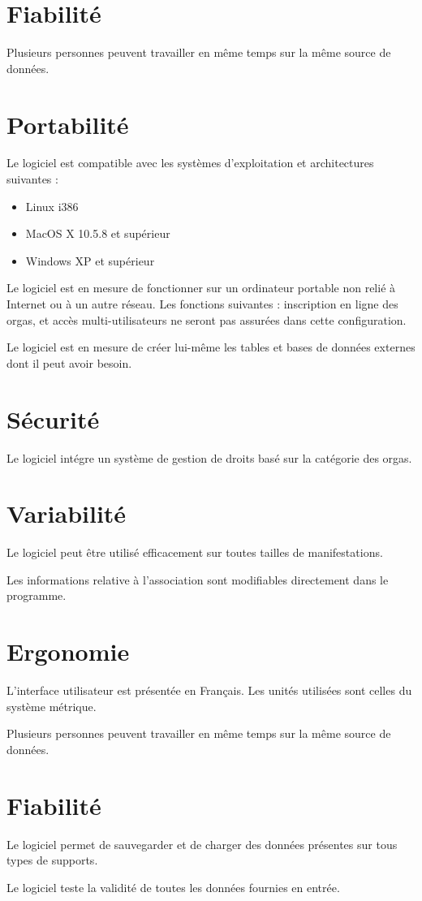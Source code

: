 \section{Fiabilité}
Plusieurs personnes peuvent travailler en même temps sur la même source de données.


\section{Portabilité}
Le logiciel est compatible avec les systèmes d'exploitation et architectures suivantes : 
\begin{itemize}
\item Linux i386
\item MacOS X 10.5.8 et supérieur
\item Windows XP et supérieur
\end{itemize}

Le logiciel est en mesure de fonctionner sur un ordinateur portable non relié à Internet ou à un autre réseau. 
Les fonctions suivantes : inscription en ligne des orgas, et accès multi-utilisateurs ne seront pas assurées dans cette configuration.

Le logiciel est en mesure de créer lui-même les tables et bases de données externes dont il peut avoir besoin.


\section{Sécurité}
Le logiciel intégre un système de gestion de droits basé sur la catégorie des orgas.


\section{Variabilité}
Le logiciel peut être utilisé efficacement sur toutes tailles de manifestations.

Les informations relative à l'association sont modifiables directement dans le programme.

\section{Ergonomie}
L'interface utilisateur est présentée en Français. Les unités utilisées sont celles du système métrique. 

Plusieurs personnes peuvent travailler en même temps sur la même source de données.


\section{Fiabilité}
Le logiciel permet de sauvegarder et de charger des données présentes sur tous types de supports.

Le logiciel teste la validité de toutes les données fournies en entrée.
